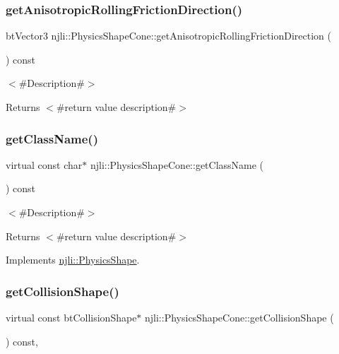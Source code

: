 \subsubsection{\texorpdfstring{get\+Anisotropic\+Rolling\+Friction\+Direction()}{getAnisotropicRollingFrictionDirection()}}
{\footnotesize\ttfamily bt\+Vector3 njli\+::\+Physics\+Shape\+Cone\+::get\+Anisotropic\+Rolling\+Friction\+Direction (\begin{DoxyParamCaption}{ }\end{DoxyParamCaption}) const}

$<$\#\+Description\#$>$

\begin{DoxyReturn}{Returns}
$<$\#return value description\#$>$ 
\end{DoxyReturn}
\mbox{\label{classnjli_1_1_physics_shape_cone_a16dabd0490dfc7d3c5695ab39939f692}} 
\subsubsection{\texorpdfstring{get\+Class\+Name()}{getClassName()}}
{\footnotesize\ttfamily virtual const char$\ast$ njli\+::\+Physics\+Shape\+Cone\+::get\+Class\+Name (\begin{DoxyParamCaption}{ }\end{DoxyParamCaption}) const\hspace{0.3cm}{\ttfamily [virtual]}}

$<$\#\+Description\#$>$

\begin{DoxyReturn}{Returns}
$<$\#return value description\#$>$ 
\end{DoxyReturn}


Implements \mbox{\hyperlink{classnjli_1_1_physics_shape_a72cb98a55614a3e264b8e4a157b45c64}{njli\+::\+Physics\+Shape}}.

\mbox{\label{classnjli_1_1_physics_shape_cone_a39f88d5fcc1139aa139c9d9163240e9a}} 
\subsubsection{\texorpdfstring{get\+Collision\+Shape()}{getCollisionShape()}\hspace{0.1cm}{\footnotesize\ttfamily [1/2]}}
{\footnotesize\ttfamily virtual const bt\+Collision\+Shape$\ast$ njli\+::\+Physics\+Shape\+Cone\+::get\+Collision\+Shape (\begin{DoxyParamCaption}{ }\end{DoxyParamCaption}) const\hspace{0.3cm}{\ttfamily [protected]}, {\ttfamily [virtual]}}



